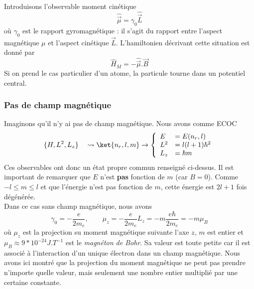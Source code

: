 	Introduisons l'observable moment cinétique
	\begin{equation}
	\hat{\vec{\mu}} = \gamma_0\hat{\vec{L}}
	\end{equation}
	où $\gamma_0$ est le rapport gyromagnétique : il s'agit du rapport entre 
	l'aspect magnétique $\mu$ et l'aspect cinétique $\vec{L}$. L'hamiltonien décrivant 
	cette situation est donné par 
	\begin{equation}
	\hat{H}_M = -\hat{\vec{\mu}}.\vec{B}
	\end{equation}
	Si on prend le cas particulier d'un atome, la particule tourne dans un potentiel central. 
	
		\subsubsection{Pas de champ magnétique}	
		Imaginons qu'il n'y ai 	pas de champ magnétique. Nous avons comme ECOC
		\begin{equation}
		\{H, L^2, L_z\}\quad \rightsquigarrow \ket{n_r,l,m} \rightarrow \left\{\begin{array}{ll}
		E &= E(n_r,l)\\
		L^2 &= l(l+1)\hbar^2\\
		L_z &= \hbar m
		\end{array}\right.
		\end{equation}
		Ces observables ont donc un état propre commun renseigné ci-dessus. Il est important de remarquer 
		que $E$ n'est \textbf{pas} fonction de $m$ (car $B=0$). Comme $-l\leq m\leq l$ et que 
		l'énergie n'est pas fonction de $m$, cette énergie est $2l+1$ fois dégénérée.\\
		
		Dans ce cas sans champ magnétique, nous avons
		\begin{equation}
		\gamma_0 = -\frac{e}{2m_e},\qquad \mu_z = -\frac{e}{2m_e}L_z = -m\frac{e\hbar}{2m_e} = 
		-m\mu_B
		\end{equation}
		où $\mu_z$ est la projection su moment magnétique suivante l'axe $z$, $m$ est entier 
		et $\mu_B \approx 9*10^{-24} J.T^{-1}$ est le \textit{magnéton de Bohr}. Sa valeur est 
		toute petite car il est associé à l'interaction d'un unique électron dans un champ
		magnétique. Nous avons ici montré que la projection du moment magnétique ne peut pas 
		prendre n'importe quelle valeur, mais seulement une nombre entier multiplié par une 
		certaine constante.
		
